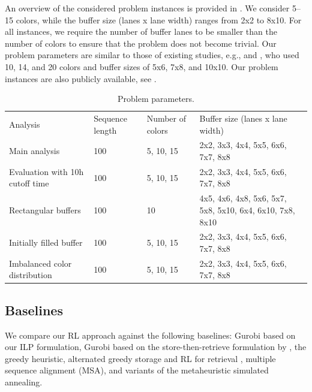\documentclass[11pt]{elsarticle}
\begin{document}

An overview of the considered problem instances is provided in . We consider 5--15 colors, while the buffer size (lanes x lane width) ranges from 2x2 to 8x10. For all instances, we require the number of buffer lanes to be smaller than the number of colors to ensure that the problem does not become trivial. Our problem parameters are similar to those of existing studies, e.g., \citet{Leng.2020} and \citet{sun2017study}, who used 10, 14, and 20 colors and buffer sizes of 5x6, 7x8, and 10x10. Our problem instances are also publicly available, see \citet{psproblemdata}.


\begin{table}[htp]
	\caption{Problem parameters.} \label{tbl:parameters_analysis} 
	\centering
	\setlength{\tabcolsep}{1pt}
	\footnotesize
	\vspace{-0.2cm}
	\begin{tabular}{L{5cm}L{2.7cm}L{2.8cm}L{5.5cm}}
		\toprule
		Analysis & Sequence length & Number of colors & Buffer size (lanes x lane width) \\ \addlinespace
		\midrule
		Main analysis & 100 & 5, 10, 15 & 2x2, 3x3, 4x4, 5x5, 6x6, 7x7, 8x8\\
		Evaluation with 10h cutoff time & 100 & 5, 10, 15 & 2x2, 3x3, 4x4, 5x5, 6x6, 7x7, 8x8\\
		Rectangular buffers & 100 & 10 & 4x5, 4x6, 4x8, 5x6, 5x7, 5x8, 5x10, 6x4, 6x10, 7x8, 8x10 \\		
		Initially filled buffer & 100 & 5, 10, 15 & 2x2, 3x3, 4x4, 5x5, 6x6, 7x7, 8x8\\		
		Imbalanced color distribution & 100 & 5, 10, 15 & 2x2, 3x3, 4x4, 5x5, 6x6, 7x7, 8x8 \\
		
		
		\bottomrule

	\end{tabular}
\end{table}


\subsection{Baselines}
\label{section:Baselines}

We compare our RL approach against the following baselines: Gurobi based on our ILP formulation, Gurobi based on the store-then-retrieve formulation by \citet{wu2021mathematical}, the greedy heuristic, alternated greedy storage and RL for retrieval \citep{Huang.2024, Leng.2020, Leng.2023},  multiple sequence alignment (MSA), and variants of the metaheuristic simulated annealing.
\end{document}
